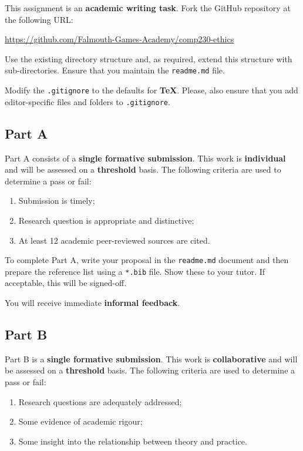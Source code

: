 \documentclass{../fal_assignment}
\newcommand{\minReferenceCount}{12 }
\begin{document}
This assignment is an \textbf{academic writing task}. Fork the GitHub repository at the following URL:

\indent \url{https://github.com/Falmouth-Games-Academy/comp230-ethics}

Use the existing directory structure and, as required, extend this structure with sub-directories. Ensure that you maintain the \texttt{readme.md} file.

Modify the \texttt{.gitignore} to the defaults for \textbf{TeX}. Please, also ensure that you add editor-specific files and folders to \texttt{.gitignore}. 

\subsection*{Part A}

Part A consists of a \textbf{single formative submission}. This work is \textbf{individual} and will be assessed on a \textbf{threshold} basis. The following criteria are used to determine a pass or fail:

\begin{enumerate}[label=(\alph*)]
	\item Submission is timely;
	\item Research question is appropriate and distinctive;
	\item At least \minReferenceCount  academic peer-reviewed sources are cited.
\end{enumerate}

To complete Part A, write your proposal in the \texttt{readme.md} document and then prepare the reference list using a \texttt{*.bib} file.  Show these to your tutor.  If acceptable, this will be signed-off. 

You will receive immediate \textbf{informal feedback}.

\subsection*{Part B}

Part B is a \textbf{single formative submission}. This work is \textbf{collaborative} and will be assessed on a \textbf{threshold} basis. The following criteria are used to determine a pass or fail:

\begin{enumerate}[label=(\alph*)]
	\item Research questions are adequately addressed;
	\item Some evidence of academic rigour;
	\item Some insight into the relationship between theory and practice.
\end{enumerate}
\end{document}
